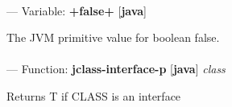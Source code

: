 \paragraph{}
\label{JAVA:+FALSE+}
--- Variable: \textbf{+false+} [\textbf{java}] \textit{}

\begin{adjustwidth}{5em}{5em}
The JVM primitive value for boolean false.
\end{adjustwidth}

\paragraph{}
\label{JAVA:JCLASS-INTERFACE-P}
--- Function: \textbf{jclass-interface-p} [\textbf{java}] \textit{class}

\begin{adjustwidth}{5em}{5em}
Returns T if CLASS is an interface
\end{adjustwidth}

